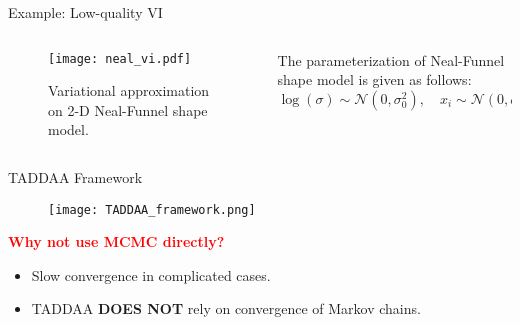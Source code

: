 \documentclass[10pt,xcolor=table]{beamer}
\begin{document}
\begin{frame}{Example: Low-quality VI}
  \begin{columns}
	\begin{column}{.44\textwidth}
		\begin{figure}[t]
			\texttt{[image: neal\_vi.pdf]}
			\caption{Variational approximation on 2-D Neal-Funnel shape model.}
		\end{figure}
	\end{column}
	\begin{column}{.6\textwidth}
The parameterization of Neal-Funnel shape model is given as follows:
$$
\log(\sigma) \sim \mathcal{N}(0, \sigma_{0}^{2}), \quad x_{i} \sim \mathcal{N}(0,\sigma).
$$
	\end{column}
\end{columns}
\end{frame}

\begin{frame}{TADDAA Framework}
\begin{figure}[t]
	\texttt{[image: TADDAA\_framework.png]}
\end{figure} \pause

\textcolor{red}{\textbf{Why not use MCMC directly?}}
\begin{itemize}
	\item Slow convergence in complicated cases.
	\item TADDAA \textbf{DOES NOT} rely on convergence of Markov chains.
\end{itemize}

\end{frame}
\end{document}
